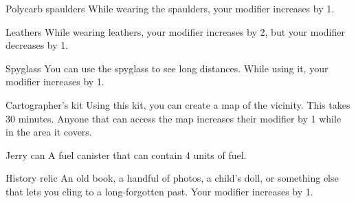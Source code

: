 \begin{describe}{Polycarb spaulders}
  While wearing the spaulders, your  modifier increases by 1.
\end{describe}

\begin{describe}{Leathers}
  While wearing leathers, your  modifier increases by 2, but your  modifier decreases by 1.
\end{describe}

\begin{describe}{Spyglass}
  You can use the spyglass to see long distances. While using it, your  modifier increases by 1.
\end{describe}

\begin{describe}{Cartographer's kit}
  Using this kit, you can create a map of the vicinity. This takes 30 minutes. Anyone that can access the map increases their  modifier by 1 while in the area it covers.
\end{describe}

\begin{describe}{Jerry can}
  A fuel canister that can contain 4 units of fuel.
\end{describe}

\begin{describe}{History relic}
  An old book, a handful of photos, a child's doll, or something else that lets you cling to a long-forgotten past. Your  modifier increases by 1.
\end{describe}
